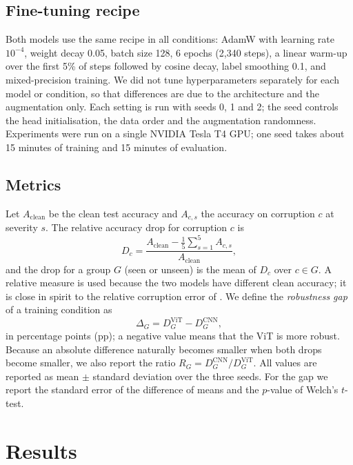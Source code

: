 \documentclass[a4paper,11pt]{article}
\begin{document}
\subsection{Fine-tuning recipe}
Both models use the same recipe in all conditions: AdamW \cite{loshchilov2019decoupled} with learning rate $10^{-4}$, weight decay 0.05, batch size 128, 6 epochs (2{,}340 steps), a linear warm-up over the first 5\% of steps followed by cosine decay, label smoothing 0.1, and mixed-precision training. We did not tune hyperparameters separately for each model or condition, so that differences are due to the architecture and the augmentation only. Each setting is run with seeds 0, 1 and 2; the seed controls the head initialisation, the data order and the augmentation randomness. Experiments were run on a single NVIDIA Tesla T4 GPU; one seed takes about 15 minutes of training and 15 minutes of evaluation.

\subsection{Metrics}
Let $A_\text{clean}$ be the clean test accuracy and $A_{c,s}$ the accuracy on corruption $c$ at severity $s$. The relative accuracy drop for corruption $c$ is
\begin{equation}
D_c = \frac{A_\text{clean} - \frac{1}{5}\sum_{s=1}^{5} A_{c,s}}{A_\text{clean}},
\end{equation}
and the drop for a group $G$ (seen or unseen) is the mean of $D_c$ over $c\in G$. A relative measure is used because the two models have different clean accuracy; it is close in spirit to the relative corruption error of \cite{hendrycks2019benchmarking}. We define the \emph{robustness gap} of a training condition as
\begin{equation}
\Delta_G = D_G^\text{ViT} - D_G^\text{CNN},
\end{equation}
in percentage points (pp); a negative value means that the ViT is more robust. Because an absolute difference naturally becomes smaller when both drops become smaller, we also report the ratio $R_G = D_G^\text{CNN}/D_G^\text{ViT}$. All values are reported as mean $\pm$ standard deviation over the three seeds. For the gap we report the standard error of the difference of means and the $p$-value of Welch's $t$-test.

\section{Results}
\label{sec:results}
\end{document}
